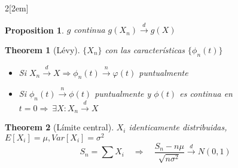 \documentclass{myclass}
\newtheorem*{theorem}{Theorem}
\newtheorem*{proposition}{Proposition}
\begin{document}
\begin{multicols}{2}[\columnsep2em]
\begin{proposition} $g$ continua 
$g(X_n) \xrightarrow{d} g(X)$ 
\end{proposition}

\begin{theorem}[Lévy] $\{X_n\}$ con las características $\{\phi_n(t)\}$
  \begin{itemize}[topsep=-6pt, itemsep=0pt]
    \item Si $X_n\xrightarrow{d} X \Rightarrow \phi_n(t) \xrightarrow{n} \varphi(t)$ puntualmente
	\item Si $\phi_n(t) \xrightarrow{n} \phi (t)$ puntualmente y $\phi(t) $ es continua en $t=0 \Rightarrow \ \exists X : X_n\xrightarrow{d} X$
  \end{itemize}
\end{theorem}

\begin{theorem}[Límite central]
$X_i$ identicamente distribuidas, $E[X_i]=\mu, Var[X_i] = \sigma ^2$
\[
S_n = \sum X_i \quad \Rightarrow \quad \frac{S_n-n\mu}{\sqrt{n\sigma ^2} } \xrightarrow{d} N(0,1)
\] 
\end{theorem}





\end{multicols}
\end{document}
